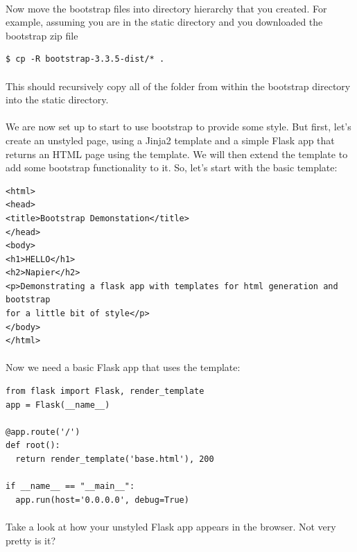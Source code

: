 \documentclass[12pt, a4paper, oneside]{book}
\begin{document}
\paragraph{} Now move the bootstrap files into directory hierarchy that you created. For example, assuming you are in the static directory and you downloaded the bootstrap zip file

\begin{lstlisting}[style=DOS]
    $ cp -R bootstrap-3.3.5-dist/* .
\end{lstlisting}

\paragraph{} This should recursively copy all of the folder from within the bootstrap directory into the static directory.

\paragraph{} We are now set up to start to use bootstrap to provide some style. But first, let's create an unstyled page, using a Jinja2 template and a simple Flask app that returns an HTML page using the template. We will then extend the template to add some bootstrap functionality to it. So, let's start with the basic template:

\begin{lstlisting}
<html>
<head>
<title>Bootstrap Demonstation</title>
</head>
<body>
<h1>HELLO</h1>
<h2>Napier</h2>
<p>Demonstrating a flask app with templates for html generation and bootstrap
for a little bit of style</p>
</body>
</html>
\end{lstlisting}

\paragraph{} Now we need a basic Flask app that uses the template:

\begin{lstlisting}
from flask import Flask, render_template
app = Flask(__name__)

@app.route('/')
def root():
  return render_template('base.html'), 200

if __name__ == "__main__":
  app.run(host='0.0.0.0', debug=True)
\end{lstlisting}

\paragraph{} Take a look at how your unstyled Flask app appears in the browser. Not very pretty is it?  
\end{document}
